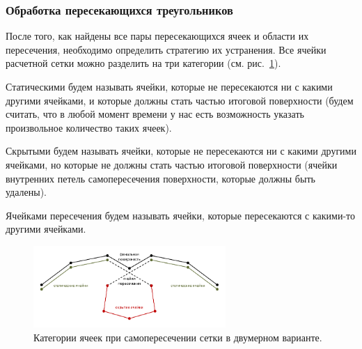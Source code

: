 \subsubsection{Обработка пересекающихся треугольников}

После того, как найдены все пары пересекающихся ячеек и области их пересечения, необходимо определить стратегию их устранения.
Все ячейки расчетной сетки можно разделить на три категории (см. рис.~\ref{fig:text_1_int_faces_categories}).

\begin{definition}
Статическими будем называть ячейки, которые не пересекаются ни с какими другими ячейками, и которые должны стать частью итоговой поверхности (будем считать, что в любой момент времени у нас есть возможность указать произвольное количество таких ячеек).
\end{definition}

\begin{definition}
Скрытыми будем называть ячейки, которые не пересекаются ни с какими другими ячейками, но которые не должны стать частью итоговой поверхности (ячейки внутренних петель самопересечения поверхности, которые должны быть удалены).
\end{definition}

\begin{definition}
Ячейками пересечения будем называть ячейки, которые пересекаются с какими-то другими ячейками. 
\end{definition}

\begin{figure}[ht]
\centering
\includegraphics[width=0.65\textwidth]{fig/int_faces_categories.pdf}
\singlespacing
{}\caption{Категории ячеек при самопересечении сетки в двумерном варианте.}\label{fig:text_1_int_faces_categories}
\end{figure}

